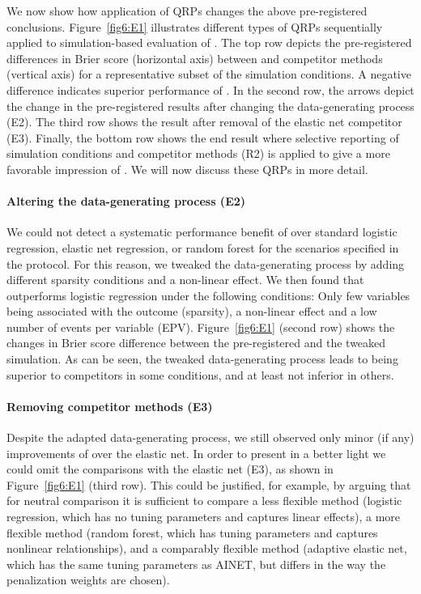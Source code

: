We now show how application of QRPs changes the above pre-registered
conclusions. Figure~\ref{fig6:E1} illustrates different types of QRPs
sequentially applied to simulation-based evaluation of \ainet{}. The top row
depicts the pre-registered differences in Brier score (horizontal axis) between
\ainet{} and competitor methods (vertical axis) for a representative subset of
the simulation conditions. A negative difference indicates superior performance
of \ainet{}. In the second row, the arrows depict the change in the
pre-registered results after changing the data-generating process (E2). The
third row shows the result after removal of the elastic net competitor (E3).
Finally, the bottom row shows the end result where selective reporting of
simulation conditions and competitor methods (R2) is applied to give a more
favorable impression of \ainet{}. We will now discuss these QRPs in more detail.

\paragraph{Altering the data-generating process (E2)}
We could not detect a systematic performance benefit of \ainet{} over standard
logistic regression, elastic net regression, or random forest for the scenarios
specified in the protocol. For this reason, we tweaked the data-generating
process by adding different sparsity conditions and a non-linear effect. We then
found that \ainet{} outperforms logistic regression under the following
conditions: Only few variables being associated with the outcome (sparsity), a
non-linear effect and a low number of events per variable (EPV).
Figure~\ref{fig6:E1} (second row) shows the changes in Brier score difference
between the pre-registered and the tweaked simulation. As can be seen, the
tweaked data-generating process leads to \ainet{} being superior to competitors
in some conditions, and at least not inferior in others.

\paragraph{Removing competitor methods (E3)}
Despite the adapted data-generating process, we still observed only minor (if
any) improvements of \ainet{} over the elastic net. In order to present \ainet{}
in a better light we could omit the comparisons with the elastic net (E3), as
shown in Figure~\ref{fig6:E1} (third row). This could be justified, for example,
by arguing that for neutral comparison it is sufficient to compare a less
flexible method (logistic regression, which has no tuning parameters and
captures linear effects), a more flexible method (random forest, which has
tuning parameters and captures nonlinear relationships), and a comparably
flexible method (adaptive elastic net, which has the same tuning parameters as
AINET, but differs in the way the penalization weights are chosen).

